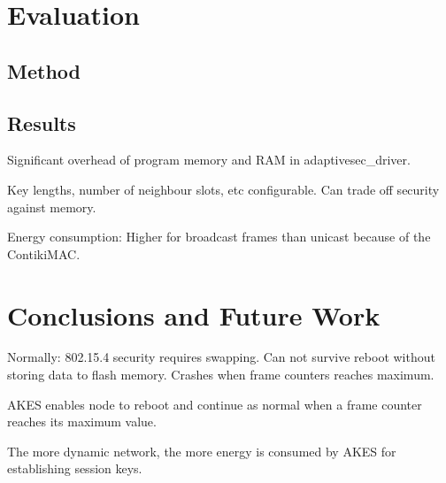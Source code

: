 \documentclass[10pt]{article}
\begin{document}
\section{Evaluation}

\subsection{Method}

\subsection{Results}

Significant overhead of program memory and RAM in adaptivesec\_driver.

Key lengths, number of neighbour slots, etc configurable. Can trade off security against memory.

Energy consumption: Higher for broadcast frames than unicast because of the ContikiMAC.



\section{Conclusions and Future Work}



Normally: 802.15.4 security requires swapping. Can not survive reboot without storing data to flash memory. Crashes when frame counters reaches maximum. 

AKES enables node to reboot and continue as normal when a frame counter reaches its maximum value.

The more dynamic network, the more energy is consumed by AKES for establishing session keys. 
\end{document}

